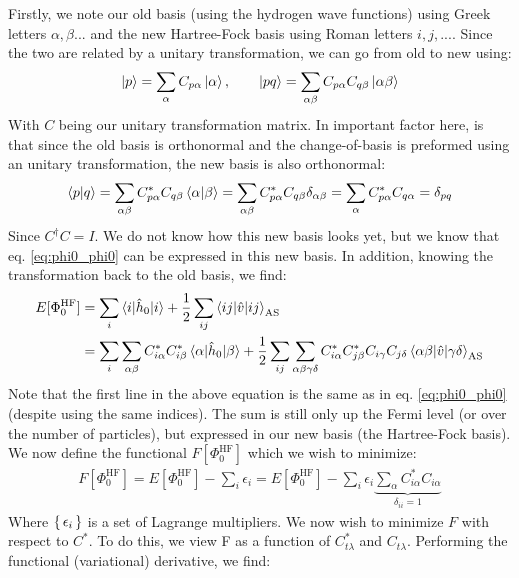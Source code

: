 \documentclass{article}
\newcommand{\inner}[3]{\braket{#1|#2|#3}}
\newcommand{\innerAS}[3]{\inner{#1}{#2}{#3}_{\text{AS}}}
\newcommand{\hnull}{\hat{h}_0}
\newcommand{\hafo}[1]{#1^{\text{HF}}}
\begin{document}
    Firstly, we note our old basis (using the hydrogen wave functions) using Greek letters $\alpha, \beta ...$ and the new Hartree-Fock basis using Roman letters $i, j, ...$. Since the two are related by a unitary transformation, we can go from old to new using:
    \begin{align*}
        \ket{p} = \sum_{\alpha} C_{p\alpha} \ket{\alpha}, \hspace{20px} \ket{pq} = \sum_{\alpha \beta} C_{p\alpha} C_{q\beta} \ket{\alpha\beta}
    \end{align*}
    With $C$ being our unitary transformation matrix. In important factor here, is that since the old basis is orthonormal and the change-of-basis is preformed using an unitary transformation, the new basis is also orthonormal:
    \begin{align*}
        \braket{p|q} = \sum_{\alpha\beta} C^*_{p\alpha}C_{q\beta}\braket{\alpha|\beta} = \sum_{\alpha\beta} C^*_{p\alpha}C_{q\beta}\delta_{\alpha\beta} = \sum_{\alpha} C^*_{p\alpha}C_{q\alpha} = \delta_{pq} 
    \end{align*}
    Since $C^\dagger C = I$. We do not know how this new basis looks yet, but we know that eq. \eqref{eq:phi0_phi0} can be expressed in this new basis. In addition, knowing the transformation back to the old basis, we find:
    \begin{align}
        E[\hafo{\Phi_0}] &= \sum_{i} \inner{i}{\hnull}{i} + \frac{1}{2} \sum_{ij} \innerAS{ij}{\hat{v}}{ij} \nonumber\\
        &= \sum_i \sum_{\alpha\beta} C^*_{i\alpha}C^*_{i\beta} \inner{\alpha}{\hnull}{\beta} + \frac{1}{2}\sum_{ij}\sum_{\alpha\beta\gamma\delta} C^*_{i\alpha}C^*_{j\beta}C_{i\gamma}C_{j\delta} \innerAS{\alpha\beta}{\hat{v}}{\gamma\delta} \label{eq:Egs_HF}
    \end{align} 
    Note that the first line in the above equation is  the same as in eq. \eqref{eq:phi0_phi0} (despite using the same indices). The sum is still only up the Fermi level (or over the number of particles), but expressed in our new basis (the Hartree-Fock basis). We now define the functional $F[\hafo{\Phi_0}]$ which we wish to minimize:
    \begin{align}
        F[\hafo{\Phi_0}] = E[\hafo{\Phi_0}] - \sum_{i} \epsilon_i =  E[\hafo{\Phi_0}] - \sum_{i} \epsilon_i \underbrace{\sum_{\alpha} C^*_{i\alpha}C_{i\alpha}}_{\delta_{ii} = 1}
    \end{align}
    Where $\set{\epsilon_i}$ is a set of Lagrange multipliers. We now wish to minimize $F$ with respect to $C^*$. To do this, we view F as a function of $C^*_{t\lambda}$ and $C_{t\lambda}$. Performing the functional (variational) derivative, we find:
\end{document}
